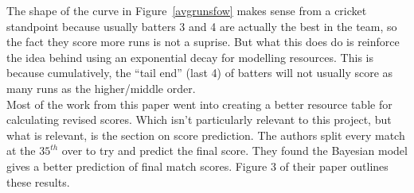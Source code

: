 The shape of the curve in Figure~\ref{avgrunsfow} makes sense from a cricket standpoint because usually batters 3 and 4 are actually the best in the team, so the fact they score more runs is not a suprise.
But what this does do is reinforce the idea behind using an exponential decay for modelling resources. This is because cumulatively, the ``tail end'' (last 4) of batters 
will not usually score as many runs as the higher/middle order. \\

Most of the work from this paper went into creating a better resource table for calculating revised scores. Which isn't particularly relevant to this project, but what is relevant, 
is the section on score prediction. The authors split every match at the $35^{th}$ over to try and predict the final score. They found the Bayesian model gives a better
prediction of final match scores. Figure 3 of their paper outlines these results.